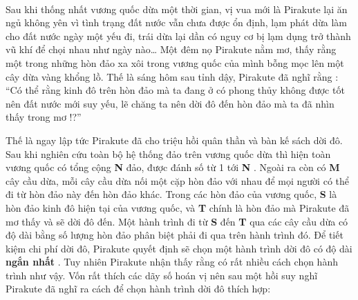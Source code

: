 

 

Sau khi thống nhất vương quốc dừa một thời gian, vị vua mới là Pirakute lại ăn ngủ không yên vì tình trạng đất nước vẫn chưa được ổn định, lạm phát dừa làm cho đất nước ngày một yếu đi, trái dừa lại dần có nguy cơ bị lạm dụng trở thành vũ khí để chọi nhau như ngày nào… Một đêm nọ Pirakute nằm mơ, thấy rằng một trong những hòn đảo xa xôi trong vương quốc của mình bỗng mọc lên một cây dừa vàng khổng lồ. Thế là sáng hôm sau tỉnh dậy, Pirakute đã nghĩ rằng : “Có thể rằng kinh đô trên hòn đảo mà ta đang ở có phong thủy không được tốt nên đất nước mới suy yếu, lẽ chăng ta nên dời đô đến hòn đảo mà ta đã nhìn thấy trong mơ !?”

Thế là ngay lập tức Pirakute đã cho triệu hồi quân thần và bàn kế sách dời đô. Sau khi nghiên cứu toàn bộ hệ thống đảo trên vương quốc dừa thì hiện toàn vương quốc có tổng cộng \textbf{ N } đảo, được đánh số từ 1 tới \textbf{ N } . Ngoài ra còn có \textbf{ M } cây cầu dừa, mỗi cây cầu dừa nối một cặp hòn đảo với nhau để mọi người có thể đi từ hòn đảo này đến hòn đảo khác. Trong các hòn đảo của vương quốc, \textbf{ S } là hòn đảo kinh đô hiện tại của vương quốc, và \textbf{ T } chính là hòn đảo mà Pirakute đã mơ thấy và sẽ dời đô đến. Một hành trình đi từ \textbf{ S } đến \textbf{ T } qua các cây cầu dừa có độ dài bằng số lượng hòn đảo phân biệt phải đi qua trên hành trình đó. Để tiết kiệm chi phí dời đô, Pirakute quyết định sẽ chọn một hành trình dời đô có độ dài \textbf{ ngắn nhất } . Tuy nhiên Pirakute nhận thấy rằng có rất nhiều cách chọn hành trình như vậy. Vốn rất thích các dãy số hoán vị nên sau một hồi suy nghĩ Pirakute đã nghĩ ra cách để chọn hành trình dời đô thích hợp:
